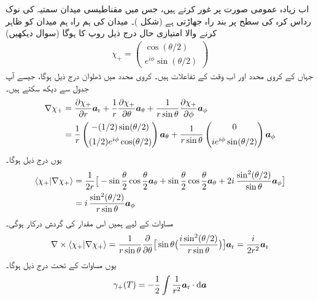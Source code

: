 اب زیادہ عمومی صورت پر غور کرتے ہیں، جس میں مقناطیسی میدان سمتیہ کی نوک رداس  کرہ کی سطح پر  بند راہ جھاڑتی ہے (شکل )۔ میدان  کی ہم راہ ہم میدان کو ظاہر کرنے والا امتیازی حال درج ذیل روپ کا ہوگا (سوال  دیکھیں)
\begin{align}
\chi_{+} = 
\begin{pmatrix}
\cos (\theta/2) \\[0.5em]
e^{i \phi} \sin (\theta /2)
\end{pmatrix}
\end{align}
جہاں  کے کروی محدد  اور  اب وقت کے تفاعلات ہیں۔ کروی محدد میں ڈھلوان درج ذیل ہوگا، جیسے آپ جدول سے دیکھ سکتے ہیں۔ 
\begin{align}
\nabla \chi_{+} &= \frac{\partial \chi_{+}}{\partial r} {\boldsymbol{a}}_{\textup{r}} + \frac{1}{r} \frac{\partial \chi_{+}}{\partial \theta} {\boldsymbol{a}}_{\theta} + \frac{1}{r \sin \theta} \frac{\partial \chi_{+}}{\partial \phi} {\boldsymbol{a}}_{\phi} \nonumber\\
&= \frac{1}{r} 
\begin{pmatrix}
- (1/2) \sin (\theta/2) \\[0.5em]
(1/2) e^{i \phi} \cos (\theta /2)
\end{pmatrix}
{\boldsymbol{a}}_{\theta} + \frac{1}{r \sin \theta}
\begin{pmatrix}
0 \\[0.5em]
i e^{i \phi} \sin (\theta /2)
\end{pmatrix} 
{\boldsymbol{a}}_{\phi}
\end{align}
یوں درج ذیل ہوگا۔
\begin{align}
\langle \chi_{+} | \nabla \chi_{+} \rangle &= \frac{1}{2r} \big [ - \sin \frac{\theta}{2} \cos \frac{\theta}{2} {\boldsymbol{a}}_{\theta} + \sin \frac{\theta}{2} \cos \frac{\theta}{2} {\boldsymbol{a}}_{\theta} + 2i \,\frac{\sin^2 (\theta/2)}{\sin \theta} {\boldsymbol{a}}_{\phi} \big ] \nonumber\\
&= i \,\frac{\sin^2 (\theta /2)}{r \sin \theta}{\boldsymbol{a}}_{\phi}
\end{align}
مساوات  کے لیے ہمیں اس مقدار کی گردش درکار ہوگی۔
\begin{align}
\nabla \times \langle \chi_{+} | \nabla \chi_{+} \rangle = \frac{1}{r \sin \theta} \frac{\partial}{\partial \theta} \big [ \sin \theta \big ( \frac{i \sin^2 (\theta /2)}{r \sin \theta} \big ) \big ] {\boldsymbol{a}}_{\textup{r}} = \frac{i}{2r^2} {\boldsymbol{a}}_{\textup{r}}
\end{align}
یوں مساوات  کے تحت درج ذیل ہوگا۔
\begin{align}
\gamma_{+} (T) = - \frac{1}{2} \int \frac{1}{r^2} \ar \cdot \dif \kvec{a}
\end{align}
